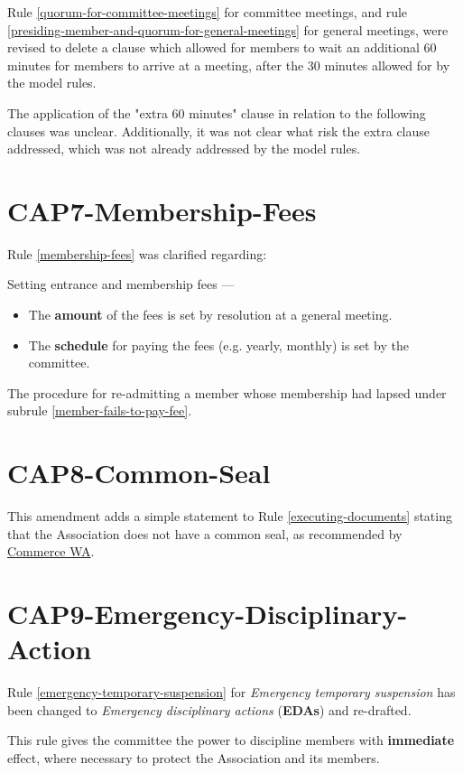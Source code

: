 \documentclass[../constitution.tex]{subfiles}
\begin{document}
Rule \ref{quorum-for-committee-meetings} for committee meetings, and rule \ref{presiding-member-and-quorum-for-general-meetings} for general meetings, were revised to delete a clause which allowed for members to wait an additional 60 minutes for members to arrive at a meeting, after the 30 minutes allowed for by the model rules.

The application of the "extra 60 minutes" clause in relation to the following clauses was unclear. Additionally, it was not clear what risk the extra clause addressed, which was not already addressed by the model rules.

\section*{CAP7-Membership-Fees}

Rule \ref{membership-fees} was clarified regarding:

Setting entrance and membership fees ---

\begin{itemize}
    \item The \textbf{amount} of the fees is set by resolution at a general meeting.
    \item The \textbf{schedule} for paying the fees (e.g. yearly, monthly) is set by the committee.
\end{itemize}

The procedure for re-admitting a member whose membership had lapsed under subrule \ref{member-fails-to-pay-fee}.

\section*{CAP8-Common-Seal}

This amendment adds a simple statement to Rule \ref{executing-documents} stating that the Association does not have a common seal, as recommended by \href{https://www.commerce.wa.gov.au/publications/whats-rules}{Commerce WA}.

\section*{CAP9-Emergency-Disciplinary-Action}

Rule \ref{emergency-temporary-suspension} for \textit{Emergency temporary suspension} has been changed to \textit{Emergency disciplinary actions} (\textbf{EDAs}) and re-drafted.

This rule gives the committee the power to discipline members with \textbf{immediate} effect, where necessary to protect the Association and its members.
\end{document}
